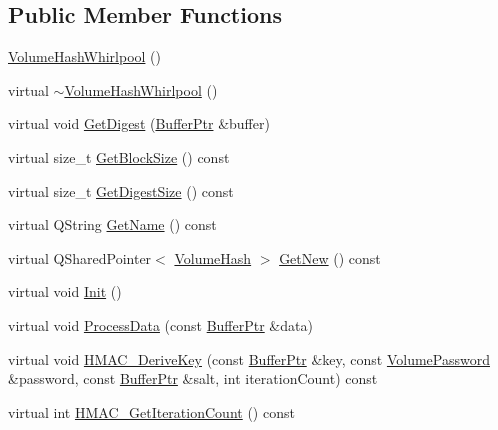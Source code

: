 \subsection*{Public Member Functions}
\begin{DoxyCompactItemize}
\item 
\hyperlink{class_gost_crypt_1_1_volume_1_1_volume_hash_whirlpool_a4e27f6a2ac26c0273586a07fb601a958}{Volume\+Hash\+Whirlpool} ()
\item 
virtual \hyperlink{class_gost_crypt_1_1_volume_1_1_volume_hash_whirlpool_ad128f6a92d13fcd12a8fcd463a4b0c9a}{$\sim$\+Volume\+Hash\+Whirlpool} ()
\item 
virtual void \hyperlink{class_gost_crypt_1_1_volume_1_1_volume_hash_whirlpool_ab59cbd894c5f44c05ea98555542f8f75}{Get\+Digest} (\hyperlink{class_gost_crypt_1_1_buffer_ptr}{Buffer\+Ptr} \&buffer)
\item 
virtual size\+\_\+t \hyperlink{class_gost_crypt_1_1_volume_1_1_volume_hash_whirlpool_af69656fa05403a8cd3245446c93a52d4}{Get\+Block\+Size} () const
\item 
virtual size\+\_\+t \hyperlink{class_gost_crypt_1_1_volume_1_1_volume_hash_whirlpool_aa43208ea8d58349c7508b090c4c1f888}{Get\+Digest\+Size} () const
\item 
virtual Q\+String \hyperlink{class_gost_crypt_1_1_volume_1_1_volume_hash_whirlpool_a84fbe785c799795ead9a7154deb54c3c}{Get\+Name} () const
\item 
virtual Q\+Shared\+Pointer$<$ \hyperlink{class_gost_crypt_1_1_volume_1_1_volume_hash}{Volume\+Hash} $>$ \hyperlink{class_gost_crypt_1_1_volume_1_1_volume_hash_whirlpool_a5555824b76b08bf911216fbab8d242ef}{Get\+New} () const
\item 
virtual void \hyperlink{class_gost_crypt_1_1_volume_1_1_volume_hash_whirlpool_af787bf1be5ab88af610062c307b92738}{Init} ()
\item 
virtual void \hyperlink{class_gost_crypt_1_1_volume_1_1_volume_hash_whirlpool_ae83645382a261787b78f43c4bfc1ed16}{Process\+Data} (const \hyperlink{class_gost_crypt_1_1_buffer_ptr}{Buffer\+Ptr} \&data)
\item 
virtual void \hyperlink{class_gost_crypt_1_1_volume_1_1_volume_hash_whirlpool_a6206f814090643431376953400727853}{H\+M\+A\+C\+\_\+\+Derive\+Key} (const \hyperlink{class_gost_crypt_1_1_buffer_ptr}{Buffer\+Ptr} \&key, const \hyperlink{class_gost_crypt_1_1_volume_1_1_volume_password}{Volume\+Password} \&password, const \hyperlink{class_gost_crypt_1_1_buffer_ptr}{Buffer\+Ptr} \&salt, int iteration\+Count) const
\item 
virtual int \hyperlink{class_gost_crypt_1_1_volume_1_1_volume_hash_whirlpool_a4e7ca73f3dd4936157a6e905d33bc4a4}{H\+M\+A\+C\+\_\+\+Get\+Iteration\+Count} () const
\end{DoxyCompactItemize}

